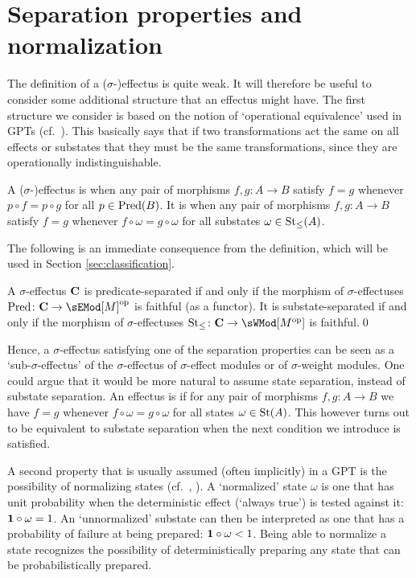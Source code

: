 \documentclass[%
	submission,
copyright,creativecommons,UKenglish]{eptcs}
\begin{document}
\section{Separation properties and normalization}\label{sec:separation}

The definition of a ($\sigma$-)effectus is quite weak. It will
therefore be useful to consider some additional structure that an
effectus might have.
The first structure we consider is based on the notion of `operational
equivalence' used in GPTs
(cf.\ \cite[\S\,2.2]{ChiribellaDP2015}).
This basically says that if two
transformations act the same on all effects or substates that they
must be the same transformations, since they are operationally
indistinguishable.

\begin{definition}
A ($\sigma$-)effectus is 
when any pair of morphisms $f,g\colon A\to B$
satisfy $f=g$ whenever $p\circ f=p\circ g$
for all $p\in\mathrm{Pred}(B)$.
It is 
when any pair of morphisms $f,g\colon A\to B$
satisfy $f=g$ whenever $f\circ\omega=g\circ \omega$
for all substates $\omega\in\mathrm{St}_{\le}(A)$.
\end{definition}

The following is an immediate consequence
from the definition,
which will be used in
Section \ref{sec:classification}.

\begin{proposition}\label{prop:separation-faithful}
A $\sigma$-effectus $\mathbf{C}$ is predicate-separated if and only if
the morphism of $\sigma$-effectuses
$\Pred\colon \catC\to \sEMod[M]^{\opp}$
is faithful (as a functor).
It is substate-separated if and only if
the morphism of $\sigma$-effectuses
$\sSt\colon \catC\to \sWMod[M^{\opp}]$
is faithful.\qed
\end{proposition}

Hence, a $\sigma$-effectus satisfying one of
the separation properties can be seen as a `sub-$\sigma$-effectus'
of the $\sigma$-effectus of $\sigma$-effect modules or of
$\sigma$-weight modules.
One could argue that it would be more natural to 
assume state separation, instead of substate separation.
An effectus is 
if for any pair of morphisms $f,g\colon A\to B$
we have $f=g$ whenever $f\circ\omega=g\circ \omega$
for all states $\omega\in\mathrm{St}(A)$.
This however turns out to be equivalent to 
substate separation when the next condition 
we introduce is satisfied.

A second property that is usually assumed
(often implicitly) in a GPT is the
possibility of normalizing states
(cf.\ \cite[\S\,4.1.4]{ChiribellaDP2015},
\cite[\S\,5.4.1]{DArianoCP2017}). A `normalized' state $\omega$
is one that has unit probability when the deterministic effect (`always true') is
tested against it: $\mathbf{1}\circ \omega = 1$. An `unnormalized'
substate can then be interpreted as one that has a probability of
failure at being prepared: $\mathbf{1}\circ \omega < 1$. Being able to
normalize a state recognizes the possibility of deterministically 
preparing any state that can be probabilistically prepared.
\end{document}
